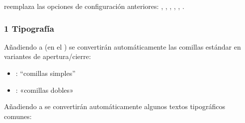 \documentclass[a4paper,10pt,oneside,spanish,openany]{sphinxmanual}
\begin{document}
\sphinxAtStartPar
{} reemplaza las opciones de configuración anteriores:
, , , , , .


\subsubsection{1 Tipografía}
\label{\detokenize{configuracion_inicial/013.guia_de_myst_parser:tipografia}}
\sphinxAtStartPar
Añadiendo  a  (en el ) se convertirán automáticamente las comillas estándar en variantes de apertura/cierre:
\begin{itemize}
\item {} 
\sphinxAtStartPar
{}: “comillas simples”

\item {} 
\sphinxAtStartPar
{}: «comillas dobles»

\end{itemize}

\sphinxAtStartPar
Añadiendo  a  se convertirán automáticamente algunos textos tipográficos comunes:
\end{document}
